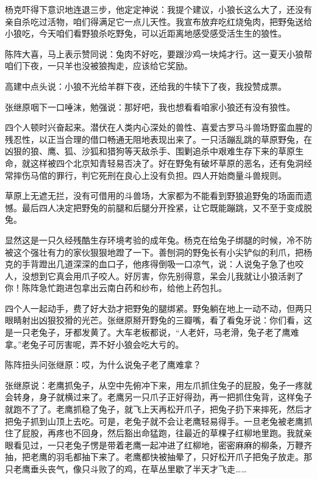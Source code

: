 \par 杨克吓得下意识地连退三步，他定定神说：我提个建议，小狼长这么大了，还没有亲自杀吃过活物，咱们得满足它一点儿天性。我宣布放弃吃红烧兔肉，把野兔送给小狼吃，今天咱们看野狼杀吃野兔，可以近距离地感受感受活生生的狼性。
\par 陈阵大喜，马上表示赞同说：兔肉不好吃，要跟沙鸡一块炖才行。这一夏天小狼帮咱们下夜，一只羊也没被狼掏走，应该给它奖励。
\par 高建中点头说：小狼不光给羊群下夜，还给我的牛犊下了夜，我投赞成票。
\par 张继原咽下一口唾沫，勉强说：那好吧，我也想看看咱家小狼还有没有狼性。
\par 四个人顿时兴奋起来。潜伏在人类内心深处的兽性、喜爱古罗马斗兽场野蛮血腥的残忍性，以正当合理的借口畅通无阻地表现出来了。一只活蹦乱跳的草原野兔，在凶狠的狼、鹰、狐、沙狐和猎狗等天敌杀手、围剿追杀中艰难生存下来的草原生命，就这样被四个北京知青轻易否决了。好在野兔有破坏草原的恶名，还有兔洞经常摔伤马倌的罪行，判它死刑在良心上没有负担。四人开始商量斗兽规则。
\par 草原上无遮无拦，没有可借用的斗兽场，大家都为不能看到野狼追野兔的场面而遗憾。最后四人决定把野兔的前腿和后腿分开拴紧，让它既能蹦跳，又不至于变成脱兔。
\par 显然这是一只久经残酷生存环境考验的成年兔。杨克在给兔子绑腿的时候，冷不防被这个强壮有力的家伙狠狠地蹬了一下。善刨洞的野兔长有小尖铲似的利爪，把杨克的手背蹬出几道深深的血口子，他疼得倒吸一口凉气，说：人说兔子急了也咬人，没想到它真会用爪子咬人。好厉害，你先别得意，呆会儿我就让小狼活剥了你！陈阵急忙跑进包拿出云南白药和纱布，给他上药包扎。
\par 四个人一起动手，费了好大劲才把野兔的腿绑紧。野兔躺在地上一动不动，但两只眼睛射出凶狠狡猾的光芒。张继原掰开野兔的三瓣嘴，看了看兔牙说：你们看，这是一只老兔子，牙都发黄了。大车老板都说，“人老奸，马老滑，兔子老了鹰难拿。”老兔子可厉害呢，弄不好小狼会吃大亏的。
\par 陈阵扭头问张继原：哎，为什么说兔子老了鹰难拿？
\par 张继原说：老鹰抓兔子，从空中先俯冲下来，用左爪抓住兔子的屁股，兔子一疼就会转身，身子就横过来了。老鹰另一只爪子正好得劲，再一把抓住兔背，这样兔子就跑不了了。老鹰抓稳了兔子，就飞上天再松开爪子，把兔子扔下来摔死，然后才把兔子抓到山顶上去吃。可是，老兔子就不会让老鹰轻易得手。一旦老兔被老鹰抓住了屁股，再疼也不回身，然后豁出命猛跑，往最近的草棵子红柳地里跑。我就亲眼看见过，一只老兔子愣是带着老鹰一起冲进了红柳地，密密麻麻的柳条，万鞭齐抽，把老鹰的羽毛都抽下来了。老鹰都快被抽晕了，只好松开爪子把兔子放走。那只老鹰垂头丧气，像只斗败了的鸡，在草丛里歇了半天才飞走……

